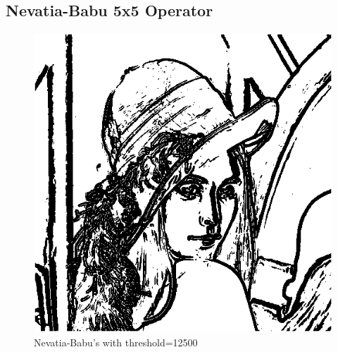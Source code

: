 \documentclass{article}
\begin{document}
\subsection{Nevatia-Babu 5x5 Operator}
\begin{figure}[H]
  \includegraphics[width=\linewidth]{img/nevatia_and_babu_12500.png}
  \caption{Nevatia-Babu's with threshold=12500}
  \label{fig:nevatia_and_babu_12500}
\end{figure}
\end{document}
